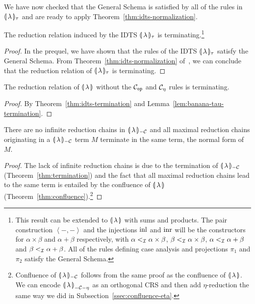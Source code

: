 We have now checked that the General Schema is satisfied by all of the
rules in ${\llparenthesis \, \lambda \, \rrparenthesis_\tau}$ and are ready to apply
Theorem~\ref{thm:idts-normalization}.

\begin{theorem}\label{thm:idts-termination}

  The reduction relation induced by the IDTS ${\llparenthesis \, \lambda \, \rrparenthesis_\tau}$ is
  terminating.\footnote{This result can be extended to ${\llparenthesis \, \lambda \, \rrparenthesis}$ with sums
    and products. The pair construction $\left<-,-\right>$ and the
    injections $\operatorname{inl}$ and $\operatorname{inr}$ will be the constructors for
    $\alpha \times \beta$ and $\alpha + \beta$ respectively, with
    $\alpha <_{\mathcal{I}} \alpha \times \beta$, $\beta <_{\mathcal{I}} \alpha \times \beta$,
    $\alpha <_{\mathcal{I}} \alpha + \beta$ and $\beta <_{\mathcal{I}} \alpha + \beta$. All of
    the rules defining case analysis and projections $\pi_1$ and $\pi_2$
    satisfy the General Schema.}
\end{theorem}

\begin{proof}
  In the prequel, we have shown that the rules of the IDTS ${\llparenthesis \, \lambda \, \rrparenthesis_\tau}$ satisfy
  the General Schema. From Theorem~\ref{thm:idts-normalization}
  of~\cite{blanqui2002inductive}, we can conclude that the reduction
  relation of ${\llparenthesis \, \lambda \, \rrparenthesis_\tau}$ is terminating.
\end{proof}

\begin{theorem}\label{thm:termination}
  
  The reduction relation of $\llparenthesis \, \lambda \, \rrparenthesis$ without the $\mathcal{C}_{\mathtt{op}}$
  and $\mathcal{C}_\eta$ rules is terminating.
\end{theorem}

\begin{proof}
  By Theorem~\ref{thm:idts-termination} and
  Lemma~\ref{lem:banana-tau-termination}.
\end{proof}

\begin{theorem}\label{thm:strong-normalization}
  
  There are no infinite reduction chains in ${\llparenthesis \, \lambda \, \rrparenthesis_{-\mathcal{C}}}$ and all maximal
  reduction chains originating in a ${\llparenthesis \, \lambda \, \rrparenthesis_{-\mathcal{C}}}$ term $M$ terminate in the
  same term, the normal form of $M$.
\end{theorem}

\begin{proof}
  The lack of infinite reduction chains is due to the termination of
  ${\llparenthesis \, \lambda \, \rrparenthesis_{-\mathcal{C}}}$ (Theorem~\ref{thm:termination}) and the fact that all maximal
  reduction chains lead to the same term is entailed by the confluence of
  ${\llparenthesis \, \lambda \, \rrparenthesis}$ (Theorem~\ref{thm:confluence}).\footnote{Confluence of
    ${\llparenthesis \, \lambda \, \rrparenthesis_{-\mathcal{C}}}$ follows from the same proof as the confluence of
    ${\llparenthesis \, \lambda \, \rrparenthesis}$. We can encode ${\llparenthesis \, \lambda \, \rrparenthesis}_{-\mathcal{C}-\eta}$ as an orthogonal CRS and
    then add $\eta$-reduction the same way we did in
    Subsection~\ref{ssec:confluence-eta}.}
\end{proof}


